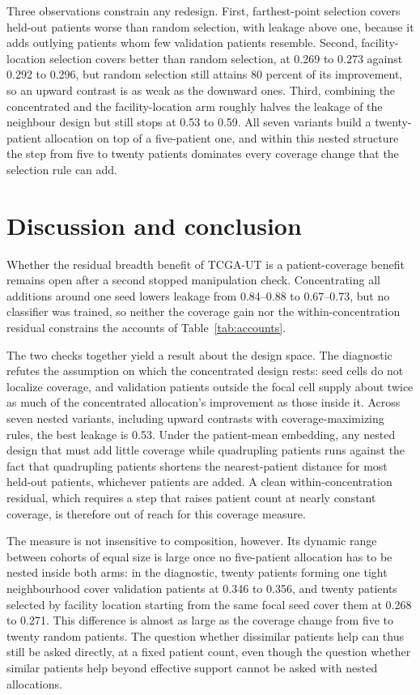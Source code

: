 Three observations constrain any redesign. First, farthest-point selection covers held-out patients worse than random selection, with leakage above one, because it adds outlying patients whom few validation patients resemble. Second, facility-location selection covers better than random selection, at 0.269 to 0.273 against 0.292 to 0.296, but random selection still attains 80 percent of its improvement, so an upward contrast is as weak as the downward ones. Third, combining the concentrated and the facility-location arm roughly halves the leakage of the neighbour design but still stops at 0.53 to 0.59. All seven variants build a twenty-patient allocation on top of a five-patient one, and within this nested structure the step from five to twenty patients dominates every coverage change that the selection rule can add.

\section{Discussion and conclusion}
\label{sec:discussion}
Whether the residual breadth benefit of TCGA-UT is a patient-coverage benefit remains open after a second stopped manipulation check. Concentrating all additions around one seed lowers leakage from 0.84--0.88 to 0.67--0.73, but no classifier was trained, so neither the coverage gain nor the within-concentration residual constrains the accounts of Table~\ref{tab:accounts}.

The two checks together yield a result about the design space. The diagnostic refutes the assumption on which the concentrated design rests: seed cells do not localize coverage, and validation patients outside the focal cell supply about twice as much of the concentrated allocation's improvement as those inside it. Across seven nested variants, including upward contrasts with coverage-maximizing rules, the best leakage is 0.53. Under the patient-mean embedding, any nested design that must add little coverage while quadrupling patients runs against the fact that quadrupling patients shortens the nearest-patient distance for most held-out patients, whichever patients are added. A clean within-concentration residual, which requires a step that raises patient count at nearly constant coverage, is therefore out of reach for this coverage measure.

The measure is not insensitive to composition, however. Its dynamic range between cohorts of equal size is large once no five-patient allocation has to be nested inside both arms: in the diagnostic, twenty patients forming one tight neighbourhood cover validation patients at 0.346 to 0.356, and twenty patients selected by facility location starting from the same focal seed cover them at 0.268 to 0.271. This difference is almost as large as the coverage change from five to twenty random patients. The question whether dissimilar patients help can thus still be asked directly, at a fixed patient count, even though the question whether similar patients help beyond effective support cannot be asked with nested allocations.


